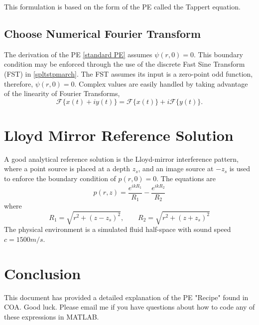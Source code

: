 \documentclass[12pt]{article}
\begin{document}
This formulation is based on the form of the PE called the Tappert
equation.  

\subsection{Choose Numerical Fourier Transform}
The derivation of the PE \eqref{standard PE} assumes $\psi(r,0) = 0$. This boundary
condition may be enforced through the use of the discrete Fast Sine Transform (FST) 
in \eqref{spltstpmarch}. The FST assumes its input is a zero-point odd function, 
therefore, $\psi(r,0) = 0$.  Complex values are easily handled by taking advantage 
of the linearity of Fourier Transforms,  
	\begin{equation}
		\mathcal{F}\big\{x(t) + iy(t)\big\} = \mathcal{F}\big\{x(t)\big\} + 
				i\mathcal{F}\big\{y(t)\big\}.
	\end{equation}

\section{Lloyd Mirror Reference Solution}
A good analytical reference solution is the Lloyd-mirror interference
pattern, where a point source is placed at a depth $z_s$, and an image
source at $-z_s$ is used to enforce the boundary condition of $p(r,0) =
0$.  The equations are
	\begin{equation}
		p(r,z) = \frac{e^{ikR_1}}{R_1} - \frac{e^{ikR_2}}{R_2}
	\end{equation}
where
	\begin{equation}
		R_1 = \sqrt{r^2 + (z - z_s)^2}, \qquad R_2 = \sqrt{r^2 + (z + z_s)^2}
	\end{equation}
The physical environment is a simulated fluid half-space with sound
speed $c = 1500 m/s$.

\section{Conclusion}
  This document has provided a detailed explanation of the PE "Recipe"
  found in COA. Good luck. Please email me if you have questions about
  how to code any of these expressions in MATLAB.
\end{document}
